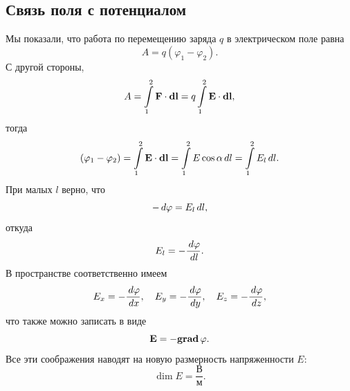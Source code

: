 	\subsection{Связь поля с потенциалом} 	

		Мы показали, что работа  по перемещению заряда $q$ в электрическом поле равна
			$$A=q\left(\varphi_1-\varphi_2\right).$$
		С другой стороны,
			$$A=\int\limits_1^2\text{\textbf{F}}\cdot\textbf{d}\text{\textbf{l}}=q\int\limits_1^2\text{\textbf{E}}\cdot\textbf{d}\text{\textbf{l}},$$
		тогда
			$$\left(\varphi_1-\varphi_2\right)=\int\limits_1^2\text{\textbf{E}}\cdot\textbf{d}\text{\textbf{l}}=\int\limits_1^2 E\cos{\alpha}\,d l=\int\limits_1^2 E_l\,d l.$$
		При малых $l$ верно, что
			$$-\,d \varphi=E_l\,d l,$$
		откуда
		\begin{equation}
			E_l=-\frac{\,d \varphi}{\,d l}.
		\end{equation}
		В пространстве соответственно имеем
			$$E_x=-\frac{\,d \varphi}{\,d x}, \quad E_y=-\frac{\,d \varphi}{\,d y}, \quad E_z=-\frac{\,d \varphi}{\,d z},$$
		что также можно записать в виде 
			$$\text{\textbf{E}}=-\textbf{grad}\,\varphi.$$
		Все эти соображения наводят на новую размерность  напряженности $E$:
			$$\dim{E}=\frac{\text{В}}{\text{м}}.$$


